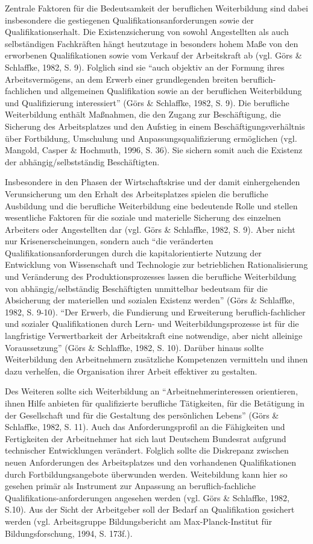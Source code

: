 \documentclass[12pt,a4paper]{article}
\begin{document}
	Zentrale Faktoren für die Bedeutsamkeit der beruflichen Weiterbildung sind dabei insbesondere die gestiegenen Qualifikationsanforderungen sowie der Qualifikationserhalt. Die Existenzsicherung von sowohl Angestellten als auch selbständigen Fachkräften hängt heutzutage in besonders hohem Maße von den erworbenen Qualifikationen sowie vom Verkauf der Arbeitskraft ab (vgl. Görs \& Schlaffke, 1982, S. 9). Folglich sind sie "`auch objektiv an der Formung ihres Arbeitsvermögens, an dem Erwerb einer grundlegenden breiten beruflich-fachlichen und allgemeinen Qualifikation sowie an der beruflichen Weiterbildung und Qualifizierung interessiert"' (Görs \& Schlaffke, 1982, S. 9). Die berufliche Weiterbildung enthält Maßnahmen, die den Zugang zur Beschäftigung, die Sicherung des Arbeitsplatzes und den Aufstieg in einem Beschäftigungsverhältnis über Fortbildung, Umschulung und Anpassungsqualifizierung ermöglichen (vgl. Mangold, Casper \& Hochmuth, 1996, S. 36). Sie sichern somit auch die Existenz der abhängig/selbstständig Beschäftigten.
	
	Insbesondere in den Phasen der Wirtschaftskrise und der damit einhergehenden Verunsicherung um den Erhalt des Arbeitsplatzes spielen die berufliche Ausbildung und die berufliche Weiterbildung eine bedeutende Rolle und stellen wesentliche Faktoren für die soziale und materielle Sicherung des einzelnen Arbeiters oder Angestellten dar (vgl. Görs \& Schlaffke, 1982, S. 9). Aber nicht nur Krisenerscheinungen, sondern auch "`die veränderten Qualifikationsanforderungen durch die kapitalorientierte Nutzung der Entwicklung von Wissenschaft und Technologie zur betrieblichen Rationalisierung und Veränderung  des Produktionsprozesses lassen die berufliche Weiterbildung von abhängig/selbständig Beschäftigten unmittelbar bedeutsam für die Absicherung der materiellen und sozialen Existenz werden"' (Görs \& Schlaffke, 1982, S. 9-10). "`Der Erwerb, die Fundierung und Erweiterung beruflich-fachlicher und sozialer Qualifikationen durch Lern- und Weiterbildungsprozesse ist für die langfristige Verwertbarkeit der Arbeitskraft eine notwendige, aber nicht alleinige Voraussetzung"' (Görs \& Schlaffke, 1982, S. 10). Darüber hinaus sollte Weiterbildung den Arbeitnehmern zusätzliche Kompetenzen vermitteln und ihnen dazu verhelfen, die Organisation ihrer Arbeit effektiver zu gestalten.
	
	Des Weiteren sollte sich Weiterbildung an "`Arbeitnehmerinteressen orientieren, ihnen Hilfe anbieten für qualifizierte berufliche Tätigkeiten, für die Betätigung in der Gesellschaft und für die Gestaltung des persönlichen Lebens"' (Görs \& Schlaffke, 1982, S. 11). Auch das Anforderungsprofil an die Fähigkeiten und Fertigkeiten der Arbeitnehmer hat sich laut Deutschem Bundesrat aufgrund technischer Entwicklungen verändert. Folglich sollte die Diskrepanz zwischen neuen Anforderungen des Arbeitsplatzes und den vorhandenen Qualifikationen durch Fortbildungsangebote überwunden werden. Weitebildung kann hier so gesehen primär als Instrument zur Anpassung an beruflich-fachliche Qualifikations-anforderungen angesehen werden (vgl. Görs \& Schlaffke, 1982, S.10).  Aus der Sicht der Arbeitgeber soll der Bedarf an Qualifikation gesichert werden (vgl. Arbeitsgruppe  Bildungsbericht am Max-Planck-Institut für Bildungsforschung, 1994, S. 173f.). 
	
\end{document}
